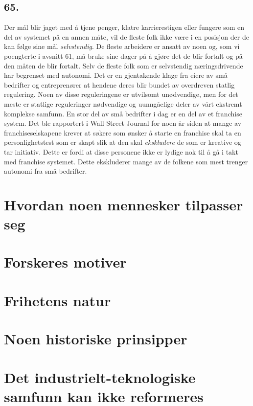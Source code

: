 \documentclass[oneside]{book}
\begin{document}
\section*{65.}
Der mål blir jaget med å tjene penger, klatre karrierestigen eller fungere som
en del av systemet på en annen måte, vil de fleste folk ikke være i en posisjon
der de kan følge sine mål \emph{selvstendig}. De fleste arbeidere er ansatt av
noen og, som vi poengterte i avsnitt 61, må bruke sine dager på å gjøre det de
blir fortalt og på den måten de blir fortalt. Selv de fleste folk som er
selvstendig næringsdrivende har begrenset med autonomi. Det er en gjentakende
klage fra eiere av små bedrifter og entreprenører at hendene deres blir bundet
av overdreven statlig regulering. Noen av disse reguleringene er utvilsomt
unødvendige, men for det meste er statlige reguleringer nødvendige og
uunngåelige deler av vårt ekstremt komplekse samfunn. En stor del av små
bedrifter i dag er en del av et franchise system. Det ble rapportert i Wall
Street Journal for noen år siden at mange av franchiseselskapene krever at
søkere som ønsker å starte en franchise skal ta en personlighetstest som er
skapt slik at den skal \emph{ekskludere} de som er kreative og tar initiativ.
Dette er fordi at disse personene ikke er lydige nok til å gå i takt med
franchise systemet. Dette ekskluderer mange av de folkene som mest trenger
autonomi fra små bedrifter.

\chapter{Hvordan noen mennesker tilpasser seg}

\chapter{Forskeres motiver}

\chapter{Frihetens natur}

\chapter{Noen historiske prinsipper}

\chapter{Det industrielt-teknologiske samfunn kan ikke reformeres}
\end{document}
